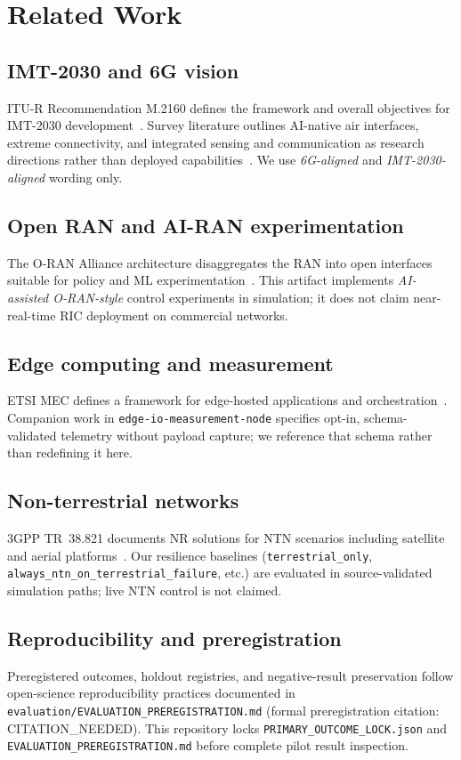 \section{Related Work}
\label{sec:related}

\subsection{IMT-2030 and 6G vision}
ITU-R Recommendation M.2160 defines the framework and overall objectives for IMT-2030 development~\cite{itu_m2160}.
Survey literature outlines AI-native air interfaces, extreme connectivity, and integrated sensing and communication as research directions rather than deployed capabilities~\cite{saad2020vision,strinati20216g}.
We use \emph{6G-aligned} and \emph{IMT-2030-aligned} wording only.

\subsection{Open RAN and AI-RAN experimentation}
The O-RAN Alliance architecture disaggregates the RAN into open interfaces suitable for policy and ML experimentation~\cite{oran_arch_v5}.
This artifact implements \emph{AI-assisted O-RAN-style} control experiments in simulation; it does not claim near-real-time RIC deployment on commercial networks.

\subsection{Edge computing and measurement}
ETSI MEC defines a framework for edge-hosted applications and orchestration~\cite{etsi_mec003}.
Companion work in \texttt{edge-io-measurement-node} specifies opt-in, schema-validated telemetry without payload capture; we reference that schema rather than redefining it here.

\subsection{Non-terrestrial networks}
3GPP TR~38.821 documents NR solutions for NTN scenarios including satellite and aerial platforms~\cite{3gpp_tr38821}.
Our resilience baselines (\texttt{terrestrial\_only}, \texttt{always\_ntn\_on\_terrestrial\_failure}, etc.) are evaluated in source-validated simulation paths; live NTN control is not claimed.

\subsection{Reproducibility and preregistration}
Preregistered outcomes, holdout registries, and negative-result preservation follow open-science reproducibility practices documented in \texttt{evaluation/EVALUATION\_PREREGISTRATION.md} (formal preregistration citation: CITATION\_NEEDED).
This repository locks \texttt{PRIMARY\_OUTCOME\_LOCK.json} and \texttt{EVALUATION\_PREREGISTRATION.md} before complete pilot result inspection.
